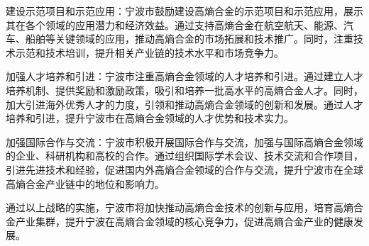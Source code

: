 建设示范项目和示范应用：宁波市鼓励建设高熵合金的示范项目和示范应用，展示其在各个领域的应用潜力和经济效益。通过支持高熵合金在航空航天、能源、汽车、船舶等关键领域的应用，推动高熵合金的市场拓展和技术推广。同时，注重技术示范和技术培训，提升相关产业链的技术水平和市场竞争力。

加强人才培养和引进：宁波市注重高熵合金领域的人才培养和引进。通过建立人才培养机制、提供奖励和激励政策，吸引和培养一批高水平的高熵合金人才。同时，加大引进海外优秀人才的力度，引领和推动高熵合金领域的创新和发展。通过人才培养和引进，提升宁波市在高熵合金领域的人才优势和技术实力。

加强国际合作与交流：宁波市积极开展国际合作与交流，加强与国际高熵合金领域的企业、科研机构和高校的合作。通过组织国际学术会议、技术交流和合作项目，引进先进技术和经验，促进国内外高熵合金领域的合作与交流，提升宁波市在全球高熵合金产业链中的地位和影响力。

通过以上战略的实施，宁波市将加快推动高熵合金技术的创新与应用，培育高熵合金产业集群，提升宁波在高熵合金领域的核心竞争力，促进高熵合金产业的健康发展。
